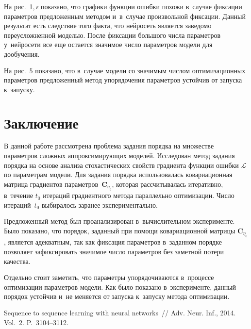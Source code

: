 \begin{multicols}{2}
На рис.~1,\,\textit{г} показано, что графики функции ошибки похожи 
в~случае фиксации па\-ра\-мет\-ров предложенным методом и~в~случае 
произвольной фиксации. Данный результат есть следствие того факта, что 
нейросеть является заведомо переусложненной моделью. После фиксации 
большого числа параметров у~нейросети все еще остается значимое число 
параметров модели для дообучения.

На рис.~5 показано, что в~случае модели со значимым 
числом оптимизационных параметров предложенный метод упорядочения 
параметров устойчив от запуска к~запуску.

\vspace*{-6pt}

\section{Заключение}

\vspace*{-2pt}

В данной работе рассмотрена проблема задания порядка на множестве 
параметров сложных аппроксимирующих моделей. Исследован метод задания 
порядка на основе анализа стохастических свойств градиента функции ошибки 
$\mathcal{L}$ по па\-ра\-мет\-рам модели. Для задания порядка использовалась 
ковариационная матрица градиентов па\-ра\-мет\-ров~$\mathbf{C}_{\eta_0}$, 
которая рассчитывалась итеративно, в~течение $t_0$ итераций градиентного 
метода параллельно оптимизации. Число итераций~$t_0$ выбиралось заранее 
экспериментально.

Предложенный метод был проанализирован в~вычислительном эксперименте. 
Было показано, что порядок, заданный при помощи ковариационной матрицы 
$\mathbf{C}_{\eta_0}$, является адекватным, так как фиксация параметров 
в~заданном порядке позволяет зафиксировать значимое число параметров без 
заметной потери качества.

Отдельно стоит заметить, что параметры упорядочиваются в~процессе 
оптимизации параметров модели. Как было показано в~эксперименте, данный 
порядок устойчив и~не меняется от запуска к~запуску метода оптимизации.

{\small\frenchspacing
 {%
 \begin{thebibliography}{99}

     Sequence to sequence learning 
with neural networks~// Adv. Neur. Inf., 
2014. Vol.~2. P.~3104--3112.
    

\end{thebibliography}}}
\end{multicols}
